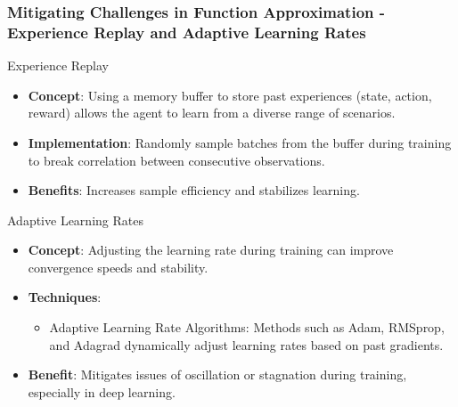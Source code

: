 \documentclass[aspectratio=169]{beamer}
\begin{document}
\begin{frame}[fragile]
    \frametitle{Mitigating Challenges in Function Approximation - Experience Replay and Adaptive Learning Rates}
    \begin{block}{Experience Replay}
        \begin{itemize}
            \item \textbf{Concept}: Using a memory buffer to store past experiences (state, action, reward) allows the agent to learn from a diverse range of scenarios.
            \item \textbf{Implementation}: Randomly sample batches from the buffer during training to break correlation between consecutive observations.
            \item \textbf{Benefits}: Increases sample efficiency and stabilizes learning.
        \end{itemize}
    \end{block}

    \begin{block}{Adaptive Learning Rates}
        \begin{itemize}
            \item \textbf{Concept}: Adjusting the learning rate during training can improve convergence speeds and stability.
            \item \textbf{Techniques}:
            \begin{itemize}
                \item Adaptive Learning Rate Algorithms: Methods such as Adam, RMSprop, and Adagrad dynamically adjust learning rates based on past gradients.
            \end{itemize}
            \item \textbf{Benefit}: Mitigates issues of oscillation or stagnation during training, especially in deep learning.
        \end{itemize}
    \end{block}
\end{frame}
\end{document}
